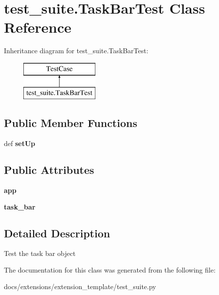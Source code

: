 \hypertarget{classtest__suite_1_1TaskBarTest}{\section{test\+\_\+suite.\+Task\+Bar\+Test Class Reference}
\label{classtest__suite_1_1TaskBarTest}
}
Inheritance diagram for test\+\_\+suite.\+Task\+Bar\+Test\+:\begin{figure}[H]
\begin{center}
\leavevmode
\includegraphics[height=2.000000cm]{classtest__suite_1_1TaskBarTest}
\end{center}
\end{figure}
\subsection*{Public Member Functions}
\begin{DoxyCompactItemize}
\item 
\hypertarget{classtest__suite_1_1TaskBarTest_a4fb9a558b494482ea7a27aba20cac5c7}{def {\bfseries set\+Up}}\label{classtest__suite_1_1TaskBarTest_a4fb9a558b494482ea7a27aba20cac5c7}

\end{DoxyCompactItemize}
\subsection*{Public Attributes}
\begin{DoxyCompactItemize}
\item 
\hypertarget{classtest__suite_1_1TaskBarTest_ad53e0ba8e35387cfb615483b7f898972}{{\bfseries app}}\label{classtest__suite_1_1TaskBarTest_ad53e0ba8e35387cfb615483b7f898972}

\item 
\hypertarget{classtest__suite_1_1TaskBarTest_a65d36a754a8278c6c572b32d92628686}{{\bfseries task\+\_\+bar}}\label{classtest__suite_1_1TaskBarTest_a65d36a754a8278c6c572b32d92628686}

\end{DoxyCompactItemize}


\subsection{Detailed Description}
\begin{DoxyVerb}Test the task bar object
\end{DoxyVerb}
 

The documentation for this class was generated from the following file\+:\begin{DoxyCompactItemize}
\item 
docs/extensions/extension\+\_\+template/test\+\_\+suite.\+py\end{DoxyCompactItemize}
